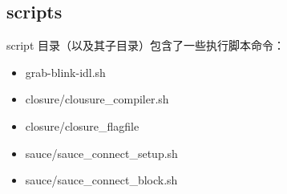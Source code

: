 \subsection{scripts}


script 目录（以及其子目录）包含了一些执行脚本命令：

\begin{itemize}
  \item grab-blink-idl.sh
  \item closure/clousure\_compiler.sh
  \item closure/closure\_flagfile
  \item sauce/sauce\_connect\_setup.sh
  \item sauce/sauce\_connect\_block.sh
\end{itemize}
